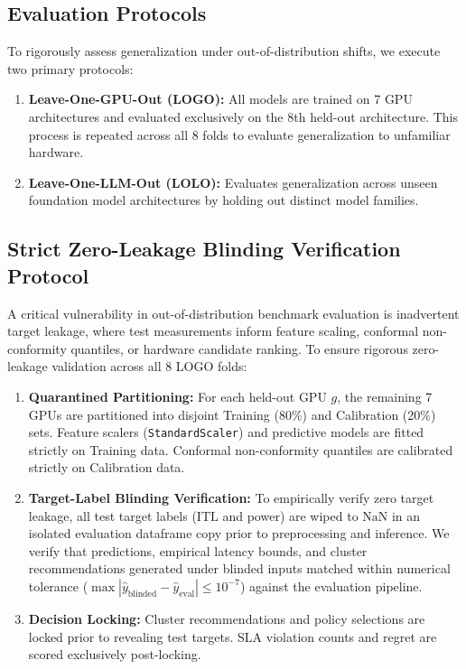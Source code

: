 \documentclass[preprint,12pt]{elsarticle}
\begin{document}
\subsection{Evaluation Protocols}
To rigorously assess generalization under out-of-distribution shifts, we execute two primary protocols:
\begin{enumerate}
    \item \textbf{Leave-One-GPU-Out (LOGO):} All models are trained on 7 GPU architectures and evaluated exclusively on the 8th held-out architecture. This process is repeated across all 8 folds to evaluate generalization to unfamiliar hardware.
    \item \textbf{Leave-One-LLM-Out (LOLO):} Evaluates generalization across unseen foundation model architectures by holding out distinct model families.
\end{enumerate}

\subsection{Strict Zero-Leakage Blinding Verification Protocol}
A critical vulnerability in out-of-distribution benchmark evaluation is inadvertent target leakage, where test measurements inform feature scaling, conformal non-conformity quantiles, or hardware candidate ranking. To ensure rigorous zero-leakage validation across all 8 LOGO folds:
\begin{enumerate}
    \item \textbf{Quarantined Partitioning:} For each held-out GPU $g$, the remaining 7 GPUs are partitioned into disjoint Training (80\%) and Calibration (20\%) sets. Feature scalers (\texttt{StandardScaler}) and predictive models are fitted strictly on Training data. Conformal non-conformity quantiles are calibrated strictly on Calibration data.
    \item \textbf{Target-Label Blinding Verification:} To empirically verify zero target leakage, all test target labels ($\text{ITL}$ and power) are wiped to $\text{NaN}$ in an isolated evaluation dataframe copy prior to preprocessing and inference. We verify that predictions, empirical latency bounds, and cluster recommendations generated under blinded inputs matched within numerical tolerance ($\max |\hat{y}_{\text{blinded}} - \hat{y}_{\text{eval}}| \le 10^{-7}$) against the evaluation pipeline.
    \item \textbf{Decision Locking:} Cluster recommendations and policy selections are locked prior to revealing test targets. SLA violation counts and regret are scored exclusively post-locking.
\end{enumerate}
\end{document}
